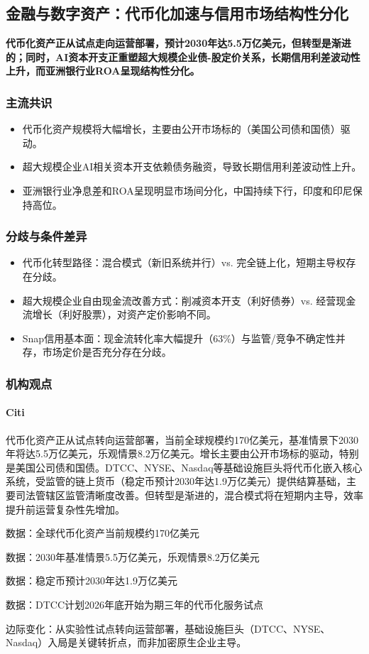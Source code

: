 \documentclass[11pt]{ctexart}
\begin{document}
\subsection{金融与数字资产：代币化加速与信用市场结构性分化}
\textbf{代币化资产正从试点走向运营部署，预计2030年达5.5万亿美元，但转型是渐进的；同时，AI资本开支正重塑超大规模企业债-股定价关系，长期信用利差波动性上升，而亚洲银行业ROA呈现结构性分化。}
\subsubsection*{主流共识}
\begin{itemize}
  \item 代币化资产规模将大幅增长，主要由公开市场标的（美国公司债和国债）驱动。
  \item 超大规模企业AI相关资本开支依赖债务融资，导致长期信用利差波动性上升。
  \item 亚洲银行业净息差和ROA呈现明显市场间分化，中国持续下行，印度和印尼保持高位。
\end{itemize}
\subsubsection*{分歧与条件差异}
\begin{itemize}
  \item 代币化转型路径：混合模式（新旧系统并行）vs. 完全链上化，短期主导权存在分歧。
  \item 超大规模企业自由现金流改善方式：削减资本开支（利好债券）vs. 经营现金流增长（利好股票），对资产定价影响不同。
  \item Snap信用基本面：现金流转化率大幅提升（63\%）与监管/竞争不确定性并存，市场定价是否充分存在分歧。
\end{itemize}
\subsubsection*{机构观点}
\paragraph{Citi} 代币化资产正从试点转向运营部署，当前全球规模约170亿美元，基准情景下2030年将达5.5万亿美元，乐观情景8.2万亿美元。增长主要由公开市场标的驱动，特别是美国公司债和国债。DTCC、NYSE、Nasdaq等基础设施巨头将代币化嵌入核心系统，受监管的链上货币（稳定币预计2030年达1.9万亿美元）提供结算基础，主要司法管辖区监管清晰度改善。但转型是渐进的，混合模式将在短期内主导，效率提升前运营复杂性先增加。
{\small\color{refgray}数据：全球代币化资产当前规模约170亿美元\par}
{\small\color{refgray}数据：2030年基准情景5.5万亿美元，乐观情景8.2万亿美元\par}
{\small\color{refgray}数据：稳定币预计2030年达1.9万亿美元\par}
{\small\color{refgray}数据：DTCC计划2026年底开始为期三年的代币化服务试点\par}
{\small\color{refgray}边际变化：从实验性试点转向运营部署，基础设施巨头（DTCC、NYSE、Nasdaq）入局是关键转折点，而非加密原生企业主导。\par}
\end{document}
